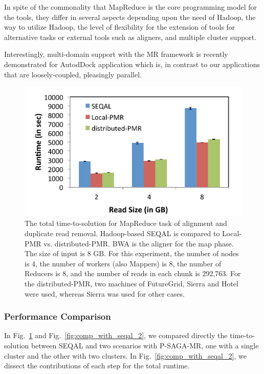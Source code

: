 \documentclass{sig-alternate}
\begin{document}
In spite of the commonality that MapReduce is the core programming model for the tools, they differ in several aspects depending upon the need of Hadoop, the way to utilize Hadoop, the level of flexibility for the extension of tools for alternative tasks or external tools such as aligners, and multiple cluster support.

Interestingly, multi-domain support with the MR framework is recently demonstrated for AutodDock application which is, in contrast to our applications that are loosely-coupled, pleasingly parallel.\cite{ecmls11-mr-autodock}

\begin{figure}
 \centering
\includegraphics[scale=0.50]{figures/seqalvslocalpmr.pdf}

\caption{\small The total time-to-solution for MapReduce task of alignment and duplicate read removal.  Hadoop-based SEQAL is compared to Local-PMR vs. distributed-PMR.  BWA is the aligner for the map phase.  The size of input is 8 GB.  For this experiment, the number of nodes is 4, the number of workers (also Mappers) is 8, the number of Reducers is 8, and the number of reads in each chunk is 292,763. For the distributed-PMR, two machines of FutureGrid, Sierra and Hotel were used, whereas Sierra was used for other cases.}

  \label{fig:comp_with_seqal_1} 
\end{figure}

\subsubsection{Performance Comparison}
In Fig.~\ref{fig:comp_with_seqal_1} and Fig.~\ref{fig:comp_with_seqal_2}, we compared directly the time-to-solution between SEQAL and two scenarios with P-SAGA-MR, one with a single cluster and the other with two clusters.  In Fig.~\ref{fig:comp_with_seqal_2}, we dissect the contributions of each step for the total runtime.  
\end{document}
